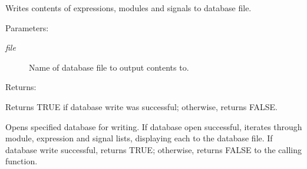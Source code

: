 Writes contents of expressions, modules and signals to database file.

\begin{Desc}
\item[Parameters: ]\par
\begin{description}
\item[{\em 
file}]Name of database file to output contents to.\end{description}
\end{Desc}
\begin{Desc}
\item[Returns: ]\par
Returns TRUE if database write was successful; otherwise, returns FALSE.\end{Desc}
Opens specified database for writing. If database open successful, iterates through module, expression and signal lists, displaying each to the database file. If database write successful, returns TRUE; otherwise, returns FALSE to the calling function. 